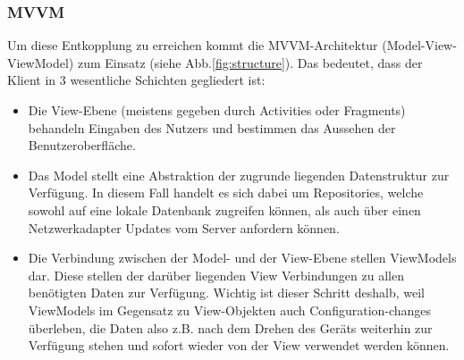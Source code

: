 \documentclass[parskip=full,11pt]{scrartcl}
\begin{document}
\subsubsection{MVVM}
Um diese Entkopplung zu erreichen kommt die MVVM-Architektur
(Model-View-ViewModel) zum Einsatz (siehe Abb.\ref{fig:structure}).
Das bedeutet, dass der Klient in 3 wesentliche Schichten gegliedert ist:
\begin{itemize}
	\item Die View-Ebene (meistens gegeben durch Activities oder Fragments)
        behandeln Eingaben des Nutzers und bestimmen das Aussehen der
        Benutzeroberfläche.
	\item Das Model stellt eine Abstraktion der zugrunde liegenden
        Datenstruktur zur Verfügung. In diesem Fall handelt es sich dabei um
        Repositories, welche sowohl auf eine lokale Datenbank zugreifen können,
        als auch über einen Netzwerkadapter Updates vom Server anfordern
        können.
	\item Die Verbindung zwischen der Model- und der View-Ebene stellen
        ViewModels dar. Diese stellen der darüber liegenden View Verbindungen
        zu allen benötigten Daten zur Verfügung.
	    Wichtig ist dieser Schritt deshalb, weil ViewModels im Gegensatz zu
        View-Objekten auch Configuration-changes überleben, die Daten also z.B.
        nach dem Drehen des Geräts weiterhin zur Verfügung stehen und sofort
        wieder von der View verwendet werden können.
\end{itemize}
\end{document}

